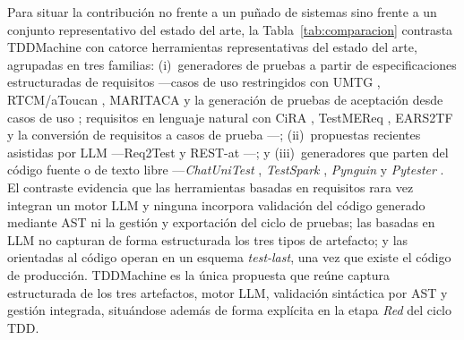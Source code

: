 \documentclass[10pt,journal,twoside,letterpaper]{IEEEtran}
\begin{document}
	Para situar la contribución no frente a un puñado de sistemas sino frente a un conjunto representativo del estado del arte, la Tabla~\ref{tab:comparacion} contrasta TDDMachine con catorce herramientas representativas del estado del arte, agrupadas en tres familias: (i)~generadores de pruebas a partir de especificaciones estructuradas de requisitos ---casos de uso restringidos con UMTG \cite{Wang2015Umtg}, RTCM/aToucan \cite{Yue2015Rtcm}, MARITACA \cite{Erazo2017Maritaca} y la generación de pruebas de aceptación desde casos de uso \cite{Wang2022Automatic}; requisitos en lenguaje natural con CiRA \cite{Frattini2023Cira}, TestMEReq \cite{Moketar2016Testmereq}, EARS2TF \cite{Liu2022Ears2tf} y la conversión de requisitos a casos de prueba \cite{Gupta2019Software}---; (ii)~propuestas recientes asistidas por LLM ---Req2Test \cite{Franca2026Req2test} y REST-at \cite{LeonQuinstedt2026Rest}---; y (iii)~generadores que parten del código fuente o de texto libre ---\emph{ChatUniTest} \cite{chen2024chatunitest}, \emph{TestSpark} \cite{sapozhnikov2024testspark}, \emph{Pynguin} \cite{lukasczyk2022pynguin} y \emph{Pytester} \cite{takerngsaksiri2025pytester}. El contraste evidencia que las herramientas basadas en requisitos rara vez integran un motor LLM y ninguna incorpora validación del código generado mediante AST ni la gestión y exportación del ciclo de pruebas; las basadas en LLM no capturan de forma estructurada los tres tipos de artefacto; y las orientadas al código operan en un esquema \emph{test-last}, una vez que existe el código de producción. TDDMachine es la única propuesta que reúne captura estructurada de los tres artefactos, motor LLM, validación sintáctica por AST y gestión integrada, situándose además de forma explícita en la etapa \emph{Red} del ciclo TDD.
\end{document}
